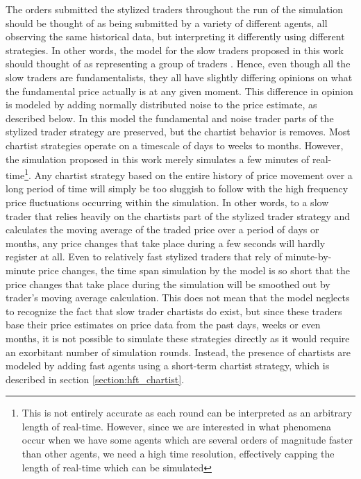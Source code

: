  The orders submitted the stylized traders throughout the run of the simulation should be thought of as being submitted by a variety of different agents, all observing the same historical data, but interpreting it differently using different strategies. In other words, the model for the slow traders proposed in this work should thought of as representing a group of traders \cite{drogoul2003multi}. Hence, even though all the slow traders are fundamentalists, they all have slightly differing opinions on what the fundamental price actually is at any given moment. This difference in opinion is modeled by adding normally distributed noise to the price estimate, as described below. In this model the fundamental and noise trader parts of the stylized trader strategy are preserved, but the chartist behavior is removes. Most chartist strategies operate on a timescale of days to weeks to months. However, the simulation proposed in this work merely simulates a few minutes of real-time\footnote{This is not entirely accurate as each round can be interpreted as an arbitrary length of real-time. However, since we are interested in what phenomena occur when we have some agents which are several orders of magnitude faster than other agents, we need a high time resolution, effectively capping the length of real-time which can be simulated}. Any chartist strategy based on the entire history of price movement over a long period of time will simply be too sluggish to follow with the high frequency price fluctuations occurring within the simulation. In other words, to a slow trader that relies heavily on the chartists part of the stylized trader strategy and calculates the moving average of the traded price over a period of days or months, any price changes that take place during a few seconds will hardly register at all. Even to relatively fast stylized traders that rely of minute-by-minute price changes, the time span simulation by the model is so short that the price changes that take place during the simulation will be smoothed out by trader's moving average calculation. This does not mean that the model neglects to recognize the fact that slow trader chartists do exist, but since these traders base their price estimates on price data from the past days, weeks or even months, it is not possible to simulate these strategies directly as it would require an exorbitant number of simulation rounds. Instead, the presence of chartists are modeled by adding fast agents using a short-term chartist strategy, which is described in section \ref{section:hft_chartist}. 
 

